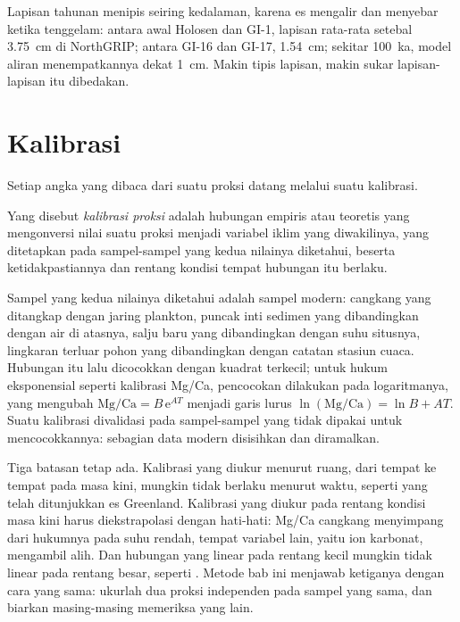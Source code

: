 Lapisan tahunan menipis seiring kedalaman, karena es mengalir dan menyebar ketika tenggelam: antara awal
Holosen dan GI-1, lapisan rata-rata setebal \qty{3.75}{cm} di NorthGRIP; antara GI-16 dan
GI-17, \qty{1.54}{cm}; sekitar \qty{100}{ka}, model aliran menempatkannya dekat \qty{1}{cm}. Makin tipis lapisan, makin sukar
lapisan-lapisan itu dibedakan.

\section{Kalibrasi}\label{sec:b2:climate-proxies:calibration}

Setiap angka yang dibaca dari suatu proksi datang melalui suatu kalibrasi.

\begin{definition}\label{def:b2:climate-proxies:calibration}
Yang disebut \emph{kalibrasi proksi} adalah hubungan empiris atau teoretis yang
mengonversi nilai suatu proksi menjadi variabel iklim yang diwakilinya, yang ditetapkan pada sampel-sampel yang
kedua nilainya diketahui, beserta ketidakpastiannya dan rentang kondisi tempat hubungan itu
berlaku.
\end{definition}

Sampel yang kedua nilainya diketahui adalah sampel modern: cangkang yang ditangkap dengan jaring plankton, puncak inti sedimen yang dibandingkan dengan air di atasnya, salju baru yang dibandingkan dengan
suhu situsnya, lingkaran terluar pohon yang dibandingkan dengan catatan stasiun cuaca.
Hubungan itu lalu dicocokkan dengan kuadrat terkecil; untuk hukum eksponensial seperti kalibrasi
Mg/Ca, pencocokan dilakukan pada logaritmanya, yang mengubah $\text{Mg/Ca} = B\,\mathrm{e}^{AT}$ menjadi
garis lurus $\ln(\text{Mg/Ca}) = \ln B + AT$. Suatu kalibrasi divalidasi pada sampel-sampel yang
tidak dipakai untuk mencocokkannya: sebagian data modern disisihkan dan diramalkan.

Tiga batasan tetap ada. Kalibrasi yang diukur menurut ruang, dari tempat ke tempat pada masa kini, mungkin tidak berlaku
menurut waktu, seperti yang telah ditunjukkan es Greenland. Kalibrasi yang diukur pada rentang kondisi masa kini
harus diekstrapolasi dengan hati-hati: Mg/Ca cangkang menyimpang dari hukumnya pada suhu rendah, tempat
variabel lain, yaitu ion karbonat, mengambil alih. Dan hubungan yang linear pada rentang kecil
mungkin tidak linear pada rentang besar, seperti . Metode bab ini
menjawab ketiganya dengan cara yang sama: ukurlah dua proksi independen pada sampel yang sama, dan biarkan masing-masing
memeriksa yang lain.

